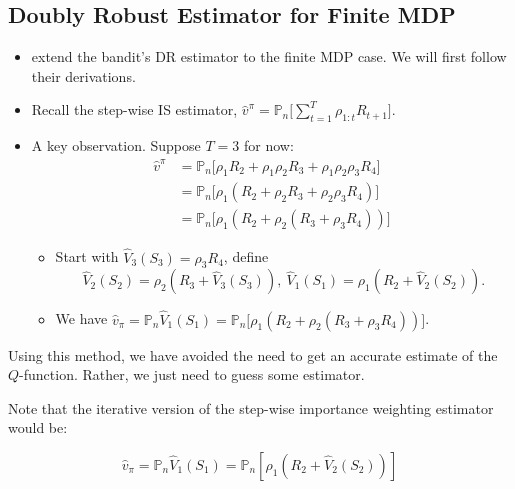 \documentclass[11pt]{article}
\def\PP{\mathbb{P}}
\def\Pn{\mathbb{P}_n}
\begin{document}
\subsection{Doubly Robust Estimator for Finite MDP}

\begin{itemize}
\item \cite{JiangLi2016} extend the bandit's DR estimator to the finite MDP case. We will first follow their derivations. 
  
\item Recall the step-wise IS estimator, $\hat v^{\pi} = \PP_n\big[\sum_{t=1}^{T} \rho_{1:t} R_{t+1}\big]$. 
  
\item A key observation. Suppose $T=3$ for now:
  \begin{align*}
    \hat v^{\pi} & = \PP_n\big[\rho_1 R_2 + \rho_1 \rho_2 R_3 + \rho_1 \rho_2 \rho_3 R_4\big]\\
      & = \PP_n\big[\rho_1 \left(R_2 +  \rho_2 R_3 +  \rho_2 \rho_3 R_4\right)\big] \\
      & = \PP_n\big[\rho_1 \left(R_2 +  \rho_2 \left(R_3 +   \rho_3 R_4\right)\right) \big]
  \end{align*}
  \vspace{-3ex}
  \begin{itemize}
  \item Start with $\hat V_3 (S_3) = \rho_3 R_4$, define 
    \[
      \hat V_2(S_2) = \rho_2(R_3 + \hat V_3(S_3)), ~ \hat V_1(S_1) = \rho_1(R_2 + \hat V_2(S_2)).
    \]
    

    
  \item We have $\hat v_\pi = \Pn \hat V_1(S_1) =  \PP_n\big[\rho_1 \left(R_2 +  \rho_2 \left(R_3 +   \rho_3 R_4\right)\right) \big] $.
  \end{itemize}
\end{itemize}


Using this method, we have avoided the need to get an accurate estimate of the $Q$-function. Rather, we just need to guess some estimator.

Note that the iterative version of the step-wise importance weighting estimator would be:

$$\hat{v}_\pi = \mathbb{P}_n \hat{V}_1(S_1)=\mathbb{P}_n\left[\rho_1\left(R_2+\hat{V}_2(S_2)\right)\right]$$
\end{document}
